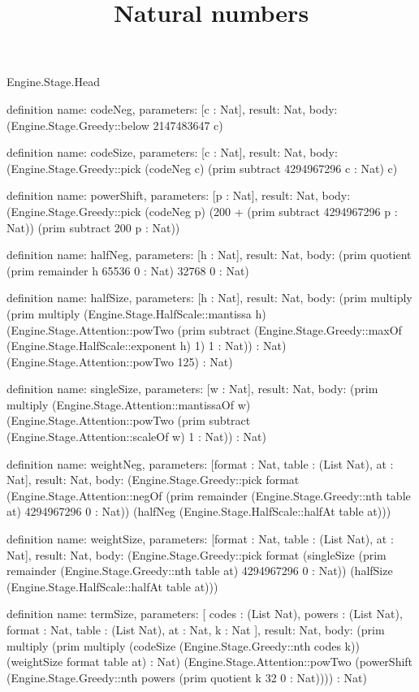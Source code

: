 \begin{lexlean}{Engine.Stage.Head}
\title{Natural numbers}
\begin{semanticmodule}
definition{
  name: codeNeg,
  parameters: [c : Nat],
  result: Nat,
  body: (Engine.Stage.Greedy::below 2147483647 c)
}

definition{
  name: codeSize,
  parameters: [c : Nat],
  result: Nat,
  body: (Engine.Stage.Greedy::pick (codeNeg c) (prim subtract 4294967296 c : Nat) c)
}

definition{
  name: powerShift,
  parameters: [p : Nat],
  result: Nat,
  body: (Engine.Stage.Greedy::pick (codeNeg p) (200 + (prim subtract 4294967296 p : Nat)) (prim subtract 200 p : Nat))
}

definition{
  name: halfNeg,
  parameters: [h : Nat],
  result: Nat,
  body: (prim quotient (prim remainder h 65536 0 : Nat) 32768 0 : Nat)
}

definition{
  name: halfSize,
  parameters: [h : Nat],
  result: Nat,
  body: (prim multiply (prim multiply (Engine.Stage.HalfScale::mantissa h) (Engine.Stage.Attention::powTwo (prim subtract (Engine.Stage.Greedy::maxOf (Engine.Stage.HalfScale::exponent h) 1) 1 : Nat)) : Nat) (Engine.Stage.Attention::powTwo 125) : Nat)
}

definition{
  name: singleSize,
  parameters: [w : Nat],
  result: Nat,
  body: (prim multiply (Engine.Stage.Attention::mantissaOf w) (Engine.Stage.Attention::powTwo (prim subtract (Engine.Stage.Attention::scaleOf w) 1 : Nat)) : Nat)
}

definition{
  name: weightNeg,
  parameters: [format : Nat, table : (List Nat), at : Nat],
  result: Nat,
  body: (Engine.Stage.Greedy::pick format (Engine.Stage.Attention::negOf (prim remainder (Engine.Stage.Greedy::nth table at) 4294967296 0 : Nat)) (halfNeg (Engine.Stage.HalfScale::halfAt table at)))
}

definition{
  name: weightSize,
  parameters: [format : Nat, table : (List Nat), at : Nat],
  result: Nat,
  body: (Engine.Stage.Greedy::pick format (singleSize (prim remainder (Engine.Stage.Greedy::nth table at) 4294967296 0 : Nat)) (halfSize (Engine.Stage.HalfScale::halfAt table at)))
}

definition{
  name: termSize,
  parameters: [
    codes : (List Nat),
    powers : (List Nat),
    format : Nat,
    table : (List Nat),
    at : Nat,
    k : Nat
  ],
  result: Nat,
  body: (prim multiply (prim multiply (codeSize (Engine.Stage.Greedy::nth codes k)) (weightSize format table at) : Nat) (Engine.Stage.Attention::powTwo (powerShift (Engine.Stage.Greedy::nth powers (prim quotient k 32 0 : Nat)))) : Nat)
}


\end{semanticmodule}
\end{lexlean}
